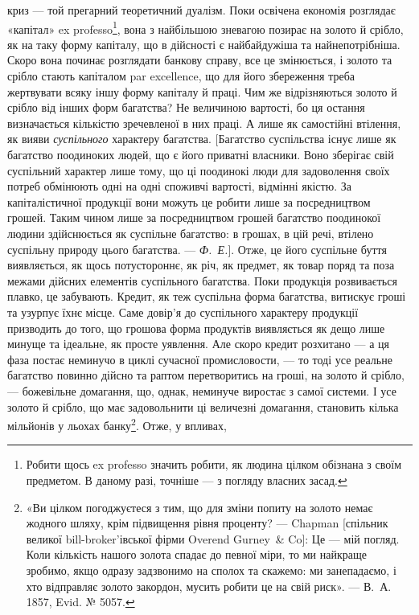 \parcont{}  %
криз — той прегарний теоретичний дуалізм. Поки освічена економія розглядає
«капітал» ex professo\footnote{Робити щось ex professo значить робити, як людина цілком обізнана з своїм предметом. В даному
разі, точніше — з погляду власних засад. }, вона з найбільшою зневагою позирає на золото й срібло,
як на таку форму капіталу, що в дійсності є найбайдужіша та найнепотрібніша.
Скоро вона починає розглядати банкову справу, все це змінюється, і золото та
срібло стають капіталом par excellence, що для його збереження треба жертвувати
всяку іншу форму капіталу й праці. Чим же відрізняються золото й
срібло від інших форм багатства? Не величиною вартості, бо ця остання визначається
кількістю зречевленої в них праці. А лише як самостійні втілення, як вияви
\emph{суспільного} характеру багатства. [Багатство суспільства існує лише як багатство
поодиноких людей, що є його приватні власники. Воно зберігає свій суспільний
характер лише тому, що ці поодинокі люди для задоволення своїх потреб
обмінюють одні на одні споживчі вартості, відмінні якістю. За капіталістичної
продукції вони можуть це робити лише за посредництвом грошей. Таким
чином лише за посредництвом грошей багатство поодинокої людини здійснюється як
суспільне багатство: в грошах, в цій речі, втілено суспільну природу цього багатства.
— \emph{Ф.~Е.}]. Отже, це його суспільне буття виявляється, як щось потустороннє,
як річ, як предмет, як товар поряд та поза межами дійсних елементів суспільного
багатства. Поки продукція розвивається плавко, це забувають. Кредит, як теж
суспільна форма багатства, витискує гроші та узурпує їхнє місце. Саме довір’я
до суспільного характеру продукції призводить до того, що грошова форма продуктів
виявляється як дещо лише минуще та ідеальне, як просте уявлення. Але
скоро кредит розхитано — а ця фаза постає неминучо в циклі сучасної промисловости,
— то тоді усе реальне багатство повинно дійсно та раптом перетворитись
на гроші, на золото й срібло, — божевільне домагання, що, однак, неминуче виростає
з самої системи. І усе золото й срібло, що має задовольнити ці величезні
домагання, становить кілька мільйонів у льохах банку\footnote{
«Ви цілком погоджуєтеся з тим, що для зміни попиту на золото немає жодного шляху, крім
підвищення
рівня проценту? — Chapman [спільник великої bill-broker’івської фірми Overend Gurney~\& Co]:
Це — мій погляд. Коли кількість нашого золота спадає до певної міри, то ми найкраще зробимо, якщо
одразу задзвонимо на сполох та скажемо: ми занепадаємо, і хто відправляє золото закордон, мусить
робити це на свій риск». — В.~А. 1857, Evid. № 5057.
}. Отже, у впливах,
